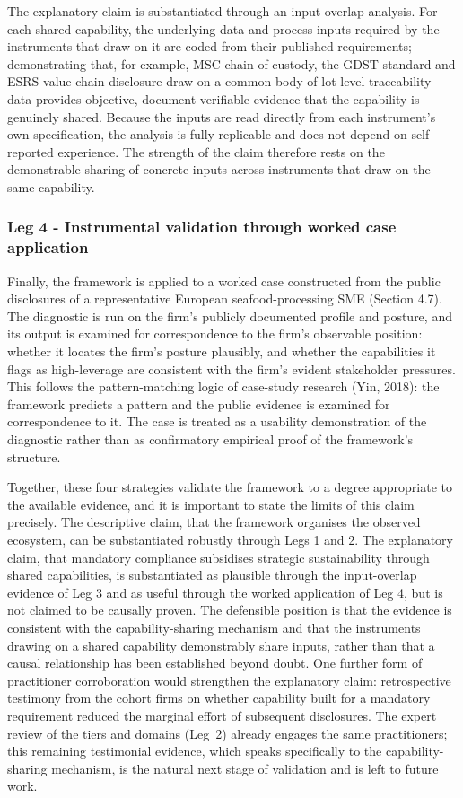 \documentclass[
]{article}
\begin{document}
The explanatory claim is substantiated through an input-overlap
analysis. For each shared capability, the underlying data and process
inputs required by the instruments that draw on it are coded from their
published requirements; demonstrating that, for example, MSC
chain-of-custody, the GDST standard and ESRS value-chain disclosure draw
on a common body of lot-level traceability data provides objective,
document-verifiable evidence that the capability is genuinely shared.
Because the inputs are read directly from each instrument's own
specification, the analysis is fully replicable and does not depend on
self-reported experience. The strength of the claim therefore rests on
the demonstrable sharing of concrete inputs across instruments that draw
on the same capability.

\subsubsection{Leg 4 - Instrumental validation through worked case
application}\label{leg-4---instrumental-validation-through-worked-case-application}

Finally, the framework is applied to a worked case constructed from the
public disclosures of a representative European seafood-processing SME
(Section 4.7). The diagnostic is run on the firm's publicly documented
profile and posture, and its output is examined for correspondence to
the firm's observable position: whether it locates the firm's posture
plausibly, and whether the capabilities it flags as high-leverage are
consistent with the firm's evident stakeholder pressures. This follows
the pattern-matching logic of case-study research (Yin, 2018): the
framework predicts a pattern and the public evidence is examined for
correspondence to it. The case is treated as a usability demonstration
of the diagnostic rather than as confirmatory empirical proof of the
framework's structure.

Together, these four strategies validate the framework to a degree
appropriate to the available evidence, and it is important to state the
limits of this claim precisely. The descriptive claim, that the
framework organises the observed ecosystem, can be substantiated
robustly through Legs 1 and 2. The explanatory claim, that mandatory
compliance subsidises strategic sustainability through shared
capabilities, is substantiated as plausible through the input-overlap
evidence of Leg 3 and as useful through the worked application of Leg 4,
but is not claimed to be causally proven. The defensible position is
that the evidence is consistent with the capability-sharing mechanism
and that the instruments drawing on a shared capability demonstrably
share inputs, rather than that a causal relationship has been
established beyond doubt. One further form of practitioner corroboration
would strengthen the explanatory claim: retrospective testimony from the
cohort firms on whether capability built for a mandatory requirement reduced
the marginal effort of subsequent disclosures. The expert review of the
tiers and domains (Leg~2) already engages the same practitioners; this
remaining testimonial evidence, which speaks specifically to the
capability-sharing mechanism, is the natural next stage of validation and is
left to future work.
\end{document}
